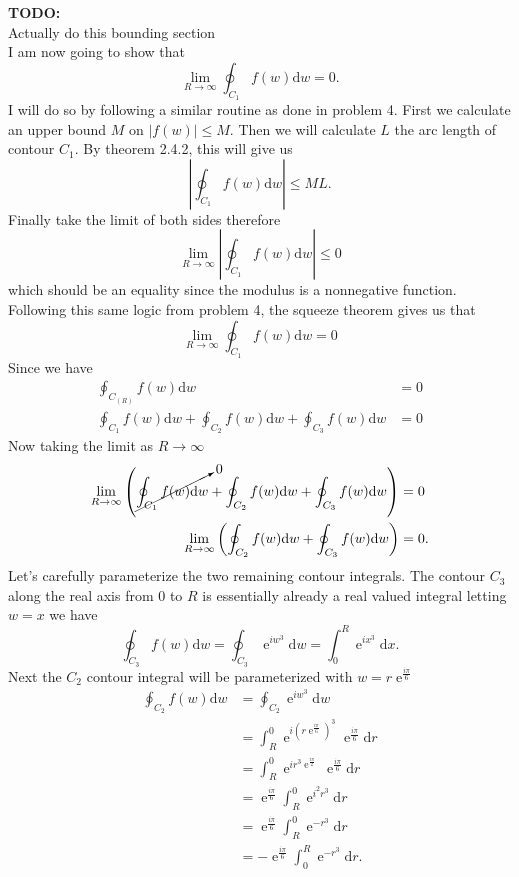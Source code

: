 \documentclass[10pt]{amsart}
\newcommand{\D}{\mathrm{d}}
\DeclareMathOperator{\E}{e}
\theoremstyle{nonumberplain}
\begin{document}
\begin{enumerate}[label={\bf {\arabic*}:}]
\noindent
\textbf{TODO:} \\
Actually do this bounding section \\
I am now going to show that $$\lim_{R \rightarrow \infty} \oint_{C_{1}} f(w) \D w = 0.$$
I will do so by following a similar routine as done in problem 4.
First we calculate an upper bound $M$ on $\left| f(w) \right| \leq M$.
Then we will calculate $L$ the arc length of contour $C_1$.
By theorem 2.4.2, this will give us
$$
\left| \oint_{C_1} f(w) \D w\right| \leq ML.
$$
Finally take the limit of both sides therefore
$$
\lim_{R \rightarrow \infty}\left| \oint_{C_1} f(w) \D w\right| \leq 0
$$
which should be an equality since the modulus is a nonnegative function.
Following this same logic from problem 4, the squeeze theorem gives us that
$$
\lim_{R \rightarrow \infty} \oint_{C_1} f(w) \D w = 0
$$
Since we have
\begin{align*}
\oint_{C_{(R)}} f(w) \D w &= 0 \\
\oint_{C_{1}} f(w) \D w + \oint_{C_{2}} f(w) \D w + \oint_{C_{3}} f(w) \D w &=0
\end{align*}
Now taking the limit as $R\rightarrow\infty$
\begin{align}
\lim_{R\rightarrow\infty}\left(\cancelto{0}{\oint_{C_{1}} f(w) \D w} + \oint_{C_{2}} f(w) \D w + \oint_{C_{3}} f(w) \D w \right) &=0 \nonumber \\
\lim_{R\rightarrow\infty}\left(\oint_{C_{2}} f(w) \D w + \oint_{C_{3}} f(w) \D w \right) &=0.
\label{eq:last}
\end{align}
Let's carefully parameterize the two remaining contour integrals. The contour $C_3$ along the real axis from $0$ to $R$ is essentially already a real valued integral letting $w = x$ we have
$$
\oint_{C_{3}} f(w) \D w = \oint_{C_{3}} \E^{iw^3} \D w = \int_{0}^{R} \E^{ix^3} \D x.
$$
Next the $C_2$ contour integral will be parameterized with $w = r\E^{\frac{i\pi}{6}}$
\begin{align*}
\oint_{C_{2}} f(w) \D w
	&= \oint_{C_{2}} \E^{iw^3} \D w \\
	&= \int_{R}^{0} \E^{i\left(r\E^{\frac{i\pi}{6}}\right)^3} \E^{\frac{i\pi}{6}} \D r \\
	&= \int_{R}^{0} \E^{ir^3\E^{\frac{i\pi}{2}}} \E^{\frac{i\pi}{6}} \D r \\
	&= \E^{\frac{i\pi}{6}} \int_{R}^{0} \E^{i^2r^3} \D r \\
	&= \E^{\frac{i\pi}{6}} \int_{R}^{0} \E^{-r^3} \D r \\
	&= - \E^{\frac{i\pi}{6}} \int_{0}^{R} \E^{-r^3} \D r.
\end{align*}

\end{enumerate}
\end{document}
